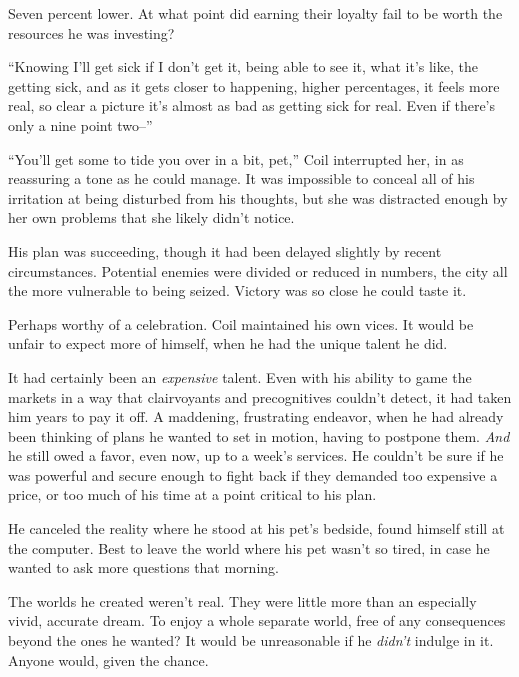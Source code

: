 Seven percent lower.  At what point did earning their loyalty fail to be worth the resources he was investing?



``Knowing I'll get sick if I don't get it, being able to see it, what it's like, the getting sick, and as it gets closer to happening, higher percentages, it feels more real, so clear a picture it's almost as bad as getting sick for real.  Even if there's only a nine point two--''



``You'll get some to tide you over in a bit, pet,'' Coil interrupted her, in as reassuring a tone as he could manage.  It was impossible to conceal all of his irritation at being disturbed from his thoughts, but she was distracted enough by her own problems that she likely didn't notice.



His plan was succeeding, though it had been delayed slightly by recent circumstances.  Potential enemies were divided or reduced in numbers, the city all the more vulnerable to being seized.  Victory was so close he could taste it.



Perhaps worthy of a celebration.  Coil maintained his own vices.  It would be unfair to expect more of himself, when he had the unique talent he did.



It had certainly been an \emph{expensive} talent.  Even with his ability to game the markets in a way that clairvoyants and precognitives couldn't detect, it had taken him years to pay it off.  A maddening, frustrating endeavor, when he had already been thinking of plans he wanted to set in motion, having to postpone them.  \emph{And} he still owed a favor, even now, up to a week's services.  He couldn't be sure if he was powerful and secure enough to fight back if they demanded too expensive a price, or too much of his time at a point critical to his plan.



He canceled the reality where he stood at his pet's bedside, found himself still at the computer.  Best to leave the world where his pet wasn't so tired, in case he wanted to ask more questions that morning.



The worlds he created weren't real.  They were little more than an especially vivid, accurate dream.  To enjoy a whole separate world, free of any consequences beyond the ones he wanted?  It would be unreasonable if he \emph{didn't} indulge in it.  Anyone would, given the chance.



